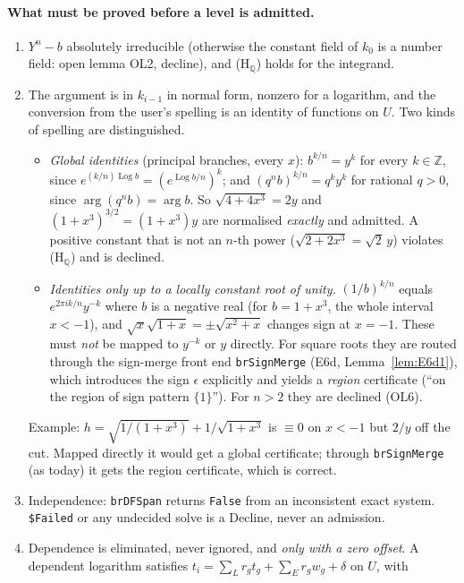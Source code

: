 \documentclass[11pt]{article}
\theoremstyle{definition}
\theoremstyle{remark}
\newcommand{\Q}{\mathbb{Q}}
\newcommand{\Z}{\mathbb{Z}}
\newcommand{\code}[1]{\texttt{#1}}
\begin{document}
\paragraph{What must be proved before a level is admitted.}
\begin{enumerate}
\item[(A0)] $Y^n-b$ absolutely irreducible (otherwise the constant field of $k_0$ is a
  number field: open lemma OL2, decline), and (H$_\Q$) holds for the integrand.
\item[(A1)] The argument is in $k_{i-1}$ in normal form, nonzero for a logarithm, and the
  conversion from the user's spelling is an identity of functions on $U$. Two kinds of
  spelling are distinguished.
  \begin{itemize}
  \item \emph{Global identities} (principal branches, every $x$): $b^{k/n}=y^k$ for every
    $k\in\Z$, since $e^{(k/n)\operatorname{Log}b}=(e^{\operatorname{Log}b/n})^k$; and
    $(q^nb)^{k/n}=q^ky^k$ for rational $q>0$, since $\arg(q^nb)=\arg b$. So
    $\sqrt{4+4x^3}=2y$ and $(1+x^3)^{3/2}=(1+x^3)y$ are normalised \emph{exactly} and
    admitted. A positive constant that is not an $n$-th power ($\sqrt{2+2x^3}=\sqrt2\,y$)
    violates (H$_\Q$) and is declined.
  \item \emph{Identities only up to a locally constant root of unity.} $(1/b)^{k/n}$ equals
    $e^{2\pi ik/n}y^{-k}$ where $b$ is a negative real (for $b=1+x^3$, the whole interval
    $x<-1$), and $\sqrt x\sqrt{1+x}=\pm\sqrt{x^2+x}$ changes sign at $x=-1$. These must
    \emph{not} be mapped to $y^{-k}$ or $y$ directly. For square roots they are routed through
    the sign-merge front end \code{brSignMerge} (E6d, Lemma~\ref{lem:E6d1}), which introduces
    the sign $\epsilon$ explicitly and yields a \emph{region} certificate (``on the region of
    sign pattern $\{1\}$''). For $n>2$ they are declined (OL6).
  \end{itemize}
  Example: $h=\sqrt{1/(1+x^3)}+1/\sqrt{1+x^3}$ is $\equiv0$ on $x<-1$ but $2/y$ off the cut.
  Mapped directly it would get a global certificate; through \code{brSignMerge} (as today)
  it gets the region certificate, which is correct.
\item[(A2)] Independence: \code{brDFSpan} returns \code{False} from an inconsistent exact
  system. \code{\$Failed} or any undecided solve is a Decline, never an admission.
\item[(A3)] Dependence is eliminated, never ignored, and \emph{only with a zero offset}.
  A dependent logarithm satisfies $t_i=\sum_Lr_gt_g+\sum_Er_gw_g+\delta$ on $U$, with

\end{enumerate}
\end{document}
